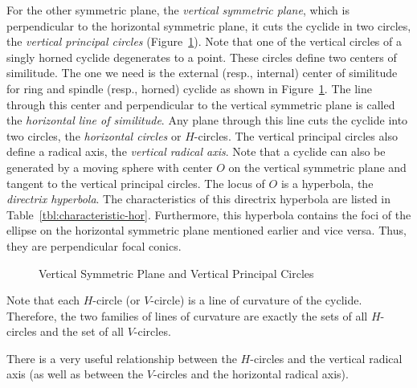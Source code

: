      For the other symmetric plane, the {\em vertical symmetric plane},
 which 
is perpendicular to the horizontal symmetric plane, it cuts the cyclide in two 
circles, the {\em vertical principal circles}
(Figure~\ref{fig:ver-circle}).
Note that one of the vertical circles of a singly horned cyclide degenerates
to a point.  These circles define two centers of similitude.  The one we need 
is the external (resp., internal) center of similitude for ring and spindle 
(resp., horned) cyclide as shown in Figure~\ref{fig:ver-circle}.  The line 
through this center and perpendicular 
to the vertical symmetric plane is called the {\em horizontal line of 
similitude}.
Any plane through this line cuts the cyclide into two circles, 
the {\em horizontal circles} or 
$H$-circles.  The vertical principal circles 
also define a radical axis, the {\em vertical radical axis}.
  Note that 
a cyclide can also be generated by a moving sphere with center $O$ on the 
vertical symmetric plane and tangent to the vertical principal circles.
The locus of $O$ is a hyperbola, the {\em directrix hyperbola}.
  The characteristics of this directrix hyperbola
are listed in Table~\ref{tbl:characteristic-hor}.  Furthermore, 
this hyperbola contains the foci of the ellipse on the horizontal symmetric 
plane mentioned earlier and vice versa.  Thus, they are perpendicular focal 
conics.
\begin{figure}
\vspace{8.5cm}
\caption{Vertical Symmetric Plane and Vertical Principal Circles}
\label{fig:ver-circle}
\end{figure}

     Note that each $H$-circle (or $V$-circle) is a line of curvature of the 
cyclide.  Therefore, the two families of lines of curvature are exactly the 
sets of all $H$-circles and the set of all $V$-circles.

     There is a very useful relationship between the $H$-circles and the
vertical radical axis (as well as between the $V$-circles and the horizontal
radical axis). 

